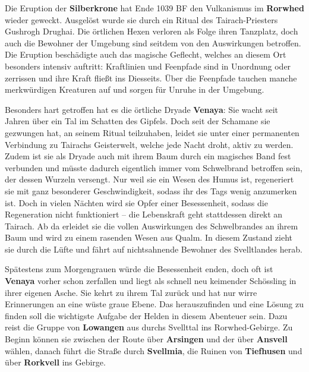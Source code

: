 \spaltenanfang



Die Eruption der \textbf{Silberkrone} hat Ende 1039 BF den Vulkanismus im \textbf{Rorwhed} wieder geweckt.
Ausgelöst wurde sie durch ein Ritual des Tairach-Priesters Gushrogh Drughai.
Die örtlichen Hexen verloren als Folge ihren Tanzplatz, doch auch die Bewohner der Umgebung sind seitdem von den Auswirkungen betroffen.
Die Eruption beschädigte auch das magische Geflecht, welches an diesem Ort besonders intensiv auftritt:
Kraftlinien und Feenpfade sind in Unordnung oder zerrissen und ihre Kraft fließt ins Diesseits.
Über die Feenpfade tauchen manche merkwürdigen Kreaturen auf und sorgen für Unruhe in der Umgebung.


Besonders hart getroffen hat es die örtliche Dryade \textbf{Venaya}:
Sie wacht seit Jahren über ein Tal im Schatten des Gipfels.
Doch seit der Schamane sie gezwungen hat, an seinem Ritual teilzuhaben, leidet sie unter einer permanenten Verbindung zu Tairachs Geisterwelt, welche jede Nacht droht, aktiv zu werden.
Zudem ist sie als Dryade auch mit ihrem Baum durch ein magisches Band fest verbunden und müsste dadurch eigentlich immer vom Schwelbrand betroffen sein, der dessen Wurzeln versengt.
Nur weil sie ein Wesen des Humus ist, regeneriert sie mit ganz besonderer Geschwindigkeit, sodass ihr des Tags wenig anzumerken ist.
Doch in vielen Nächten wird sie Opfer einer Besessenheit, sodass die Regeneration nicht funktioniert -- die Lebenskraft geht stattdessen direkt an Tairach.
Ab da erleidet sie die vollen Auswirkungen des Schwelbrandes an ihrem Baum und wird zu einem rasenden Wesen aus Qualm.
In diesem Zustand zieht sie durch die Lüfte und fährt auf nichtsahnende Bewohner des Svelltlandes herab.


Spätestens zum Morgengrauen würde die Besessenheit enden, doch oft ist \textbf{Venaya} vorher schon zerfallen und liegt als schnell neu keimender Schössling in ihrer eigenen Asche.
Sie kehrt zu ihrem Tal zurück und hat nur wirre Erinnerungen an eine wüste graue Ebene.
Das herauszufinden und eine Lösung zu finden soll die wichtigste Aufgabe der Helden in diesem Abenteuer sein.
Dazu reist die Gruppe von \textbf{Lowangen} aus durchs Svellttal ins Rorwhed-Gebirge.
Zu Beginn können sie zwischen der Route über \textbf{Arsingen} und der über \textbf{Ansvell} wählen, danach führt die Straße durch \textbf{Svellmia}, die Ruinen von \textbf{Tiefhusen} und über \textbf{Rorkvell} ins Gebirge.

